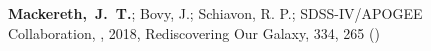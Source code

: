 \item[{\scriptsize1}]\textbf{Mackereth,~J.~T.}; Bovy, J.; Schiavon, R. P.; SDSS-IV/APOGEE Collaboration, , 2018, Rediscovering Our Galaxy, {334}, 265 ()
